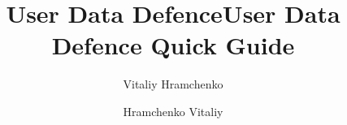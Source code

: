 
\graphicspath{{./}}


\title{User Data Defence}
\author{Vitaliy Hramchenko}

\title{User Data Defence Quick Guide}
\author{Hramchenko Vitaliy}

 


\maketitle
\tableofcontents








